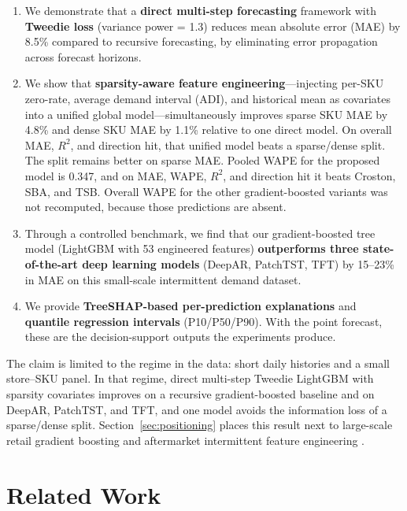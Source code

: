 \documentclass[review,authoryear]{elsarticle}
\begin{document}
\begin{enumerate}
    \item We demonstrate that a \textbf{direct multi-step forecasting} framework with \textbf{Tweedie loss} (variance power = 1.3) reduces mean absolute error (MAE) by 8.5\% compared to recursive forecasting, by eliminating error propagation across forecast horizons.
    \item We show that \textbf{sparsity-aware feature engineering}---injecting per-SKU zero-rate, average demand interval (ADI), and historical mean as covariates into a unified global model---simultaneously improves sparse SKU MAE by 4.8\% and dense SKU MAE by 1.1\% relative to one direct model. On overall MAE, $R^{2}$, and direction hit, that unified model beats a sparse/dense split. The split remains better on sparse MAE. Pooled WAPE for the proposed model is 0.347, and on MAE, WAPE, $R^{2}$, and direction hit it beats Croston, SBA, and TSB. Overall WAPE for the other gradient-boosted variants was not recomputed, because those predictions are absent.
    \item Through a controlled benchmark, we find that our gradient-boosted tree model (LightGBM with 53 engineered features) \textbf{outperforms three state-of-the-art deep learning models} (DeepAR, PatchTST, TFT) by 15--23\% in MAE on this small-scale intermittent demand dataset.
    \item We provide \textbf{TreeSHAP-based per-prediction explanations} and \textbf{quantile regression intervals} (P10/P50/P90). With the point forecast, these are the decision-support outputs the experiments produce.
\end{enumerate}

The claim is limited to the regime in the data: short daily histories and a small store--SKU panel. In that regime, direct multi-step Tweedie LightGBM with sparsity covariates improves on a recursive gradient-boosted baseline and on DeepAR, PatchTST, and TFT, and one model avoids the information loss of a sparse/dense split. Section~\ref{sec:positioning} places this result next to large-scale retail gradient boosting \citep{long2025ijpe} and aftermarket intermittent feature engineering \citep{nathan2026scirep}.

\section{Related Work}
\end{document}
